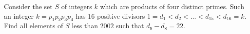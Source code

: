 Consider the set $S$ of integers $k$ which are products of four distinct primes. Such an integer $k=p_1p_2p_3p_4$ has $16$ positive divisors $1=d_1<d_2<\ldots <d_{15}<d_{16}=k$. Find all elements of $S$ less than $2002$ such that $d_9-d_8=22$.
